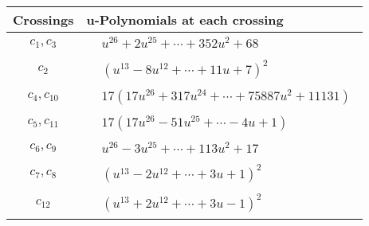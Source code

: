 \documentclass[1p]{elsarticle_modified}
\theoremstyle{definition}
\begin{document}
\begin{tabular}{m{50pt}|m{274pt}}
Crossings & \hspace{64pt}u-Polynomials at each crossing \\
\hline $$\begin{aligned}c_{1},c_{3}\end{aligned}$$&$\begin{aligned}
&u^{26}+2 u^{25}+\cdots+352 u^2+68
\end{aligned}$\\
\hline $$\begin{aligned}c_{2}\end{aligned}$$&$\begin{aligned}
&(u^{13}-8 u^{12}+\cdots+11 u+7)^{2}
\end{aligned}$\\
\hline $$\begin{aligned}c_{4},c_{10}\end{aligned}$$&$\begin{aligned}
&17(17 u^{26}+317 u^{24}+\cdots+75887 u^{2}+11131)
\end{aligned}$\\
\hline $$\begin{aligned}c_{5},c_{11}\end{aligned}$$&$\begin{aligned}
&17(17 u^{26}-51 u^{25}+\cdots-4 u+1)
\end{aligned}$\\
\hline $$\begin{aligned}c_{6},c_{9}\end{aligned}$$&$\begin{aligned}
&u^{26}-3 u^{25}+\cdots+113 u^2+17
\end{aligned}$\\
\hline $$\begin{aligned}c_{7},c_{8}\end{aligned}$$&$\begin{aligned}
&(u^{13}-2 u^{12}+\cdots+3 u+1)^{2}
\end{aligned}$\\
\hline $$\begin{aligned}c_{12}\end{aligned}$$&$\begin{aligned}
&(u^{13}+2 u^{12}+\cdots+3 u-1)^{2}
\end{aligned}$\\
\hline
\end{tabular}\\~\\
\end{document}
